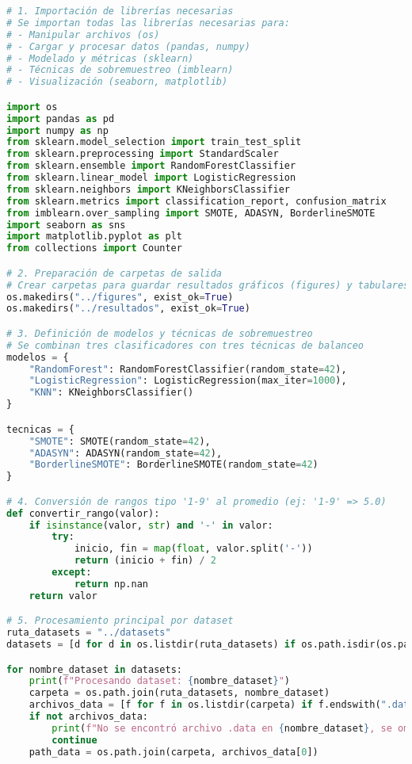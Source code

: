 
\begin{lstlisting}[language=Python, caption={Script de experimentación automática}, label={lst:script_experimento}]
# 1. Importación de librerías necesarias
# Se importan todas las librerías necesarias para:
# - Manipular archivos (os)
# - Cargar y procesar datos (pandas, numpy)
# - Modelado y métricas (sklearn)
# - Técnicas de sobremuestreo (imblearn)
# - Visualización (seaborn, matplotlib)

import os
import pandas as pd
import numpy as np
from sklearn.model_selection import train_test_split
from sklearn.preprocessing import StandardScaler
from sklearn.ensemble import RandomForestClassifier
from sklearn.linear_model import LogisticRegression
from sklearn.neighbors import KNeighborsClassifier
from sklearn.metrics import classification_report, confusion_matrix
from imblearn.over_sampling import SMOTE, ADASYN, BorderlineSMOTE
import seaborn as sns
import matplotlib.pyplot as plt
from collections import Counter

# 2. Preparación de carpetas de salida
# Crear carpetas para guardar resultados gráficos (figures) y tabulares (resultados)
os.makedirs("../figures", exist_ok=True)
os.makedirs("../resultados", exist_ok=True)

# 3. Definición de modelos y técnicas de sobremuestreo
# Se combinan tres clasificadores con tres técnicas de balanceo
modelos = {
    "RandomForest": RandomForestClassifier(random_state=42),
    "LogisticRegression": LogisticRegression(max_iter=1000),
    "KNN": KNeighborsClassifier()
}

tecnicas = {
    "SMOTE": SMOTE(random_state=42),
    "ADASYN": ADASYN(random_state=42),
    "BorderlineSMOTE": BorderlineSMOTE(random_state=42)
}

# 4. Conversión de rangos tipo '1-9' al promedio (ej: '1-9' => 5.0)
def convertir_rango(valor):
    if isinstance(valor, str) and '-' in valor:
        try:
            inicio, fin = map(float, valor.split('-'))
            return (inicio + fin) / 2
        except:
            return np.nan
    return valor

# 5. Procesamiento principal por dataset
ruta_datasets = "../datasets"
datasets = [d for d in os.listdir(ruta_datasets) if os.path.isdir(os.path.join(ruta_datasets, d))]

for nombre_dataset in datasets:
    print(f"Procesando dataset: {nombre_dataset}")
    carpeta = os.path.join(ruta_datasets, nombre_dataset)
    archivos_data = [f for f in os.listdir(carpeta) if f.endswith(".data")]
    if not archivos_data:
        print(f"No se encontró archivo .data en {nombre_dataset}, se omite.")
        continue
    path_data = os.path.join(carpeta, archivos_data[0])


\end{lstlisting}
